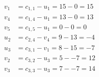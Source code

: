 \[
\begin{aligned}
v_{1} &= c_{1,1} - u_{1} = 15 - 0 = 15 \\
v_{4} &= c_{1,4} - u_{1} = 13 - 0 = 13 \\
v_{5} &= c_{1,5} - u_{1} = 0 - 0 = 0 \\
u_{2} &= c_{2,4} - v_{4} = 9 - 13 = -4 \\
u_{3} &= c_{3,1} - v_{1} = 8 - 15 = -7 \\
v_{2} &= c_{3,2} - u_{3} = 5 - -7 = 12 \\
v_{3} &= c_{3,3} - u_{3} = 7 - -7 = 14 \\
\end{aligned}
\]

